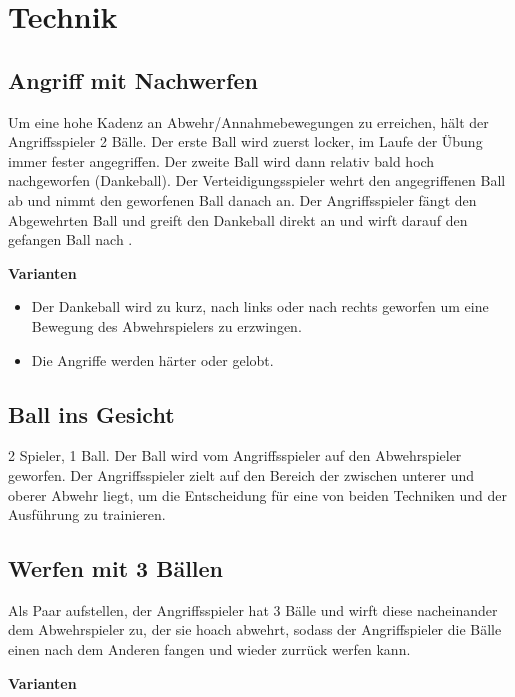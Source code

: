 \documentclass[]{book}
\providecommand{\tightlist}{%
  \setlength{\itemsep}{0pt}\setlength{\parskip}{0pt}}
\begin{document}
\section{Technik}\label{technik}

\subsection{Angriff mit Nachwerfen}\label{angriff-mit-nachwerfen}

Um eine hohe Kadenz an Abwehr/Annahmebewegungen zu erreichen, hält der
Angriffsspieler 2 Bälle. Der erste Ball wird zuerst locker, im Laufe der
Übung immer fester angegriffen. Der zweite Ball wird dann relativ bald
hoch nachgeworfen (Dankeball). Der Verteidigungsspieler wehrt den
angegriffenen Ball ab und nimmt den geworfenen Ball danach an. Der
Angriffsspieler fängt den Abgewehrten Ball und greift den Dankeball
direkt an und wirft darauf den gefangen Ball nach \citep{hauser2016}.

\textbf{Varianten}

\begin{itemize}
\tightlist
\item
  Der Dankeball wird zu kurz, nach links oder nach rechts geworfen um
  eine Bewegung des Abwehrspielers zu erzwingen.
\item
  Die Angriffe werden härter oder gelobt.
\end{itemize}

\subsection{Ball ins Gesicht}\label{ball-ins-gesicht}

2 Spieler, 1 Ball. Der Ball wird vom Angriffsspieler auf den
Abwehrspieler geworfen. Der Angriffsspieler zielt auf den Bereich der
zwischen unterer und oberer Abwehr liegt, um die Entscheidung für eine
von beiden Techniken und der Ausführung zu trainieren.

\subsection{Werfen mit 3 Bällen}\label{werfen-mit-3-ballen}

Als Paar aufstellen, der Angriffsspieler hat 3 Bälle und wirft diese
nacheinander dem Abwehrspieler zu, der sie hoach abwehrt, sodass der
Angriffspieler die Bälle einen nach dem Anderen fangen und wieder
zurrück werfen kann.

\textbf{Varianten}
\end{document}
